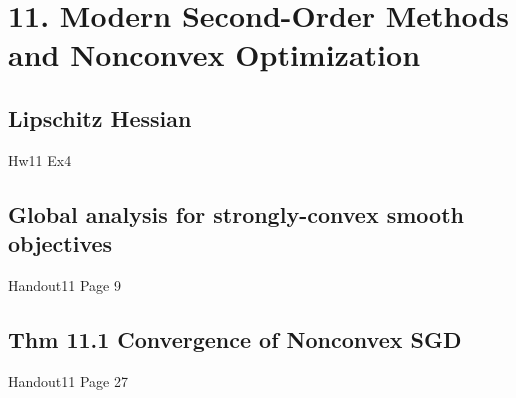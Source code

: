 \section*{11. Modern Second-Order Methods and Nonconvex Optimization}


\subsection*{Lipschitz Hessian}
Hw11 Ex4


\subsection*{Global analysis for strongly-convex smooth objectives}
Handout11 Page 9



\subsection*{Thm 11.1 Convergence of Nonconvex SGD}
Handout11 Page 27
